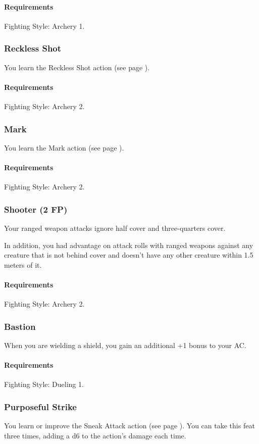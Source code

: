     \paragraph{Requirements} Fighting Style: Archery 1.
\subsubsection{Reckless Shot} \label{feat::recklessshot}
    You learn the Reckless Shot action (see page \pageref{act::recklessshot}).
    \paragraph{Requirements} Fighting Style: Archery 2.
\subsubsection{Mark} \label{feat::mark}
    You learn the Mark action (see page \pageref{act::mark}).
    \paragraph{Requirements} Fighting Style: Archery 2.
\subsubsection{Shooter (2 FP)} \label{feat::shooter}
    Your ranged weapon attacks ignore half cover and three-quarters cover.

    In addition, you had advantage on attack rolls with ranged weapons against any creature that is not behind cover and doesn't have any other creature within 1.5 meters of it.
    \paragraph{Requirements} Fighting Style: Archery 2.
\subsubsection{Bastion} \label{feat::bastion}
    When you are wielding a shield, you gain an additional +1 bonus to your AC.
    \paragraph{Requirements} Fighting Style: Dueling 1.
\subsubsection{Purposeful Strike} \label{feat::purposefulstrike}
    You learn or improve the Sneak Attack action (see page \pageref{act::sneakattack}).
    You can take this feat three times, adding a d6 to the action's damage each time.

